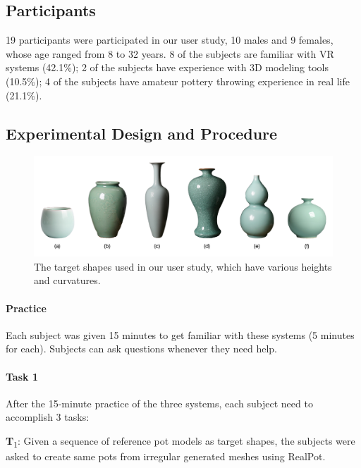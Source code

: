 \documentclass{svjour3}                     %
\begin{document}
\subsection{Participants}
\label{sec:6.2}
19 participants were participated in our user study, 10 males and 9 females, whose age ranged from 8 to 32 years. 8 of the subjects are familiar with VR systems (42.1\%); 2 of the subjects have experience with 3D modeling tools (10.5\%); 4 of the subjects have amateur pottery throwing experience in real life (21.1\%).

\subsection{Experimental Design and Procedure}
\label{sec:6.3}

\begin{figure}
\includegraphics[width=\textwidth]{fig12}
\caption{The target shapes used in our user study, which have various heights and curvatures.}
\label{fig:target}
\end{figure}

\paragraph{Practice} Each subject was given 15 minutes to get familiar with these systems (5 minutes for each). Subjects can ask questions whenever they need help.

\paragraph{Task 1} After the 15-minute practice of the three systems, each subject need to accomplish 3 tasks:

\textbf{T}\textsubscript{1}: Given a sequence of reference pot models as target shapes, the subjects were asked to create same pots from irregular generated meshes using RealPot. 
\end{document}
